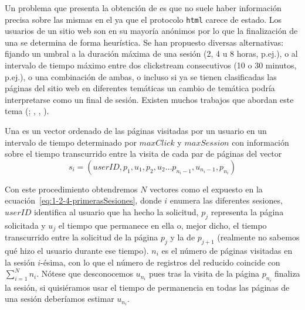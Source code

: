Un problema que presenta la obtención de \sns es que no suele haber información precisa sobre las mismas en el \flog ya que el protocolo \texttt{html} carece de estado. Los usuarios de un sitio web son en su mayoría anónimos por lo que la finalización de una \sn se determina de forma heurística. Se han propuesto diversas alternativas: fijando un umbral a la duración máxima de una sesión (2, 4 u 8 horas, p.ej.), o al intervalo de tiempo máximo entre dos clickstream consecutivos (10 o 30 minutos, p.ej.), o una combinación de ambas, o incluso si ya se tienen clasificadas las páginas del sitio web en diferentes temáticas un cambio de temática podría interpretarse como un final de sesión. Existen muchos trabajos que abordan este tema (\cite{HeGoker-DetectingSessionBoundaries-2000,HuangPengAnSchuurmansCercone-SessionBoundaryDetection-2003}; \citeauthor{HuangPengAnSchuurmans-DynamicWebLogSessionBoundaryDetection-2004}, \cite*{HuangPengAnSchuurmans-DynamicWebLogSessionBoundaryDetection-2004}, \cite*{HuangPengAnSchuurmans-DynamicWebLogSessionIdentification-2004}).

\begin{Definition}[\Sn]\label{def:1-2-4-sesion}
  Una \sn es un vector ordenado de las páginas visitadas por un usuario en un intervalo de tiempo determinado por $maxClick$ y $maxSession$ con información sobre el tiempo transcurrido entre la visita de cada par de páginas del vector
  \begin{equation}\label{eq:1-2-4-primerasSesiones}
    s_i = \left({userID}, p_1, u_1, p_2, u_2\ldots p_{n_i-1}, u_{n_i-1}, p_{n_i}\right)
  \end{equation}
\end{Definition}

Con este procedimiento obtendremos $N$ vectores como el expuesto en la ecuación~\ref{eq:1-2-4-primerasSesiones}, donde $i$ enumera las diferentes sesiones, $userID$ identifica al usuario que ha hecho la solicitud, $p_j$ representa la página solicitada y $u_j$ el tiempo que permanece en ella o, mejor dicho, el tiempo transcurrido entre la solicitud de la página $p_j$ y la de $p_{j+1}$ (realmente no sabemos qué hizo el usuario durante ese tiempo). $n_i$ es el número de páginas visitadas en la sesión $i$-ésima, con lo que el número de registros del \flog reducido coincide con $\sum_{i=1}^N{n_i}$. Nótese que desconocemos $u_{n_i}$ pues tras la visita de la página $p_{n_i}$ finaliza la sesión, si quisiéramos usar el tiempo de permanencia en todas las páginas de una sesión deberíamos estimar $u_{n_i}$.

